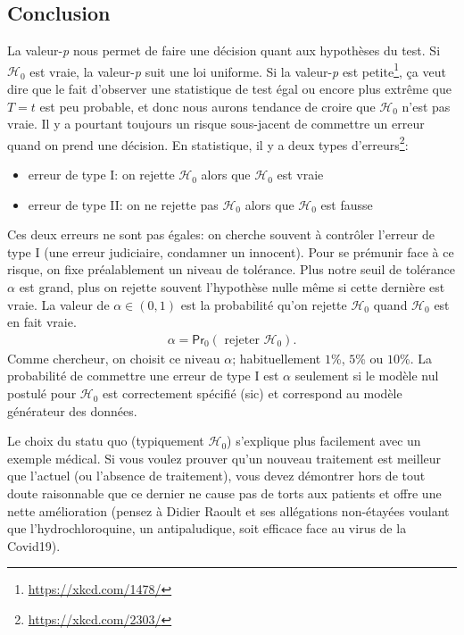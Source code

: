 \documentclass[
  11pt,
  letterpaper,
]{book}
\providecommand{\tightlist}{%
  \setlength{\itemsep}{0pt}\setlength{\parskip}{0pt}}
\renewcommand{\href}[2]{#2\footnote{\url{#1}}}
\theoremstyle{definition}
\theoremstyle{definition}
\theoremstyle{definition}
\theoremstyle{remark}
\begin{document}
\hypertarget{conclusion}{%
\subsection{Conclusion}\label{conclusion}}

La valeur-\emph{p} nous permet de faire une décision quant aux hypothèses du test. Si \(\mathscr{H}_0\) est vraie, la valeur-\emph{p} suit une loi uniforme. \href{https://xkcd.com/1478/}{Si la valeur-\emph{p} est petite}, ça veut dire que le fait d'observer une statistique de test égal ou encore plus extrême que \(T=t\) est peu probable, et donc nous aurons tendance de croire que \(\mathscr{H}_0\) n'est pas vraie. Il y a pourtant toujours un risque sous-jacent de commettre un erreur quand on prend une décision. En statistique, il y a \href{https://xkcd.com/2303/}{deux types d'erreurs}:

\begin{itemize}
\tightlist
\item
  erreur de type I: on rejette \(\mathscr{H}_0\) alors que \(\mathscr{H}_0\) est vraie
\item
  erreur de type II: on ne rejette pas \(\mathscr{H}_0\) alors que \(\mathscr{H}_0\) est fausse
\end{itemize}

Ces deux erreurs ne sont pas égales: on cherche souvent à contrôler l'erreur de type I (une erreur judiciaire, condamner un innocent). Pour se prémunir face à ce risque, on fixe préalablement un niveau de tolérance. Plus notre seuil de tolérance \(\alpha\) est grand, plus on rejette souvent l'hypothèse nulle même si cette dernière est vraie.
La valeur de \(\alpha \in (0, 1)\) est la probabilité qu'on rejette \(\mathscr{H}_0\) quand \(\mathscr{H}_0\) est en fait vraie.
\begin{align*}
\alpha = \mathsf{Pr}_0\left(\text{ rejeter } \mathscr{H}_0\right).
\end{align*}
Comme chercheur, on choisit ce niveau \(\alpha\); habituellement \(1\)\%, \(5\)\% ou \(10\)\%. La probabilité de commettre une erreur de type I est \(\alpha\) seulement si le modèle nul postulé pour \(\mathscr{H}_0\) est correctement spécifié (sic) et correspond au modèle générateur des données.

Le choix du statu quo (typiquement \(\mathscr{H}_0\)) s'explique plus facilement avec un exemple médical. Si vous voulez prouver qu'un nouveau traitement est meilleur que l'actuel (ou l'absence de traitement), vous devez démontrer hors de tout doute raisonnable que ce dernier ne cause pas de torts aux patients et offre une nette amélioration (pensez à Didier Raoult et ses allégations non-étayées voulant que l'hydrochloroquine, un antipaludique, soit efficace face au virus de la Covid19).
\end{document}
